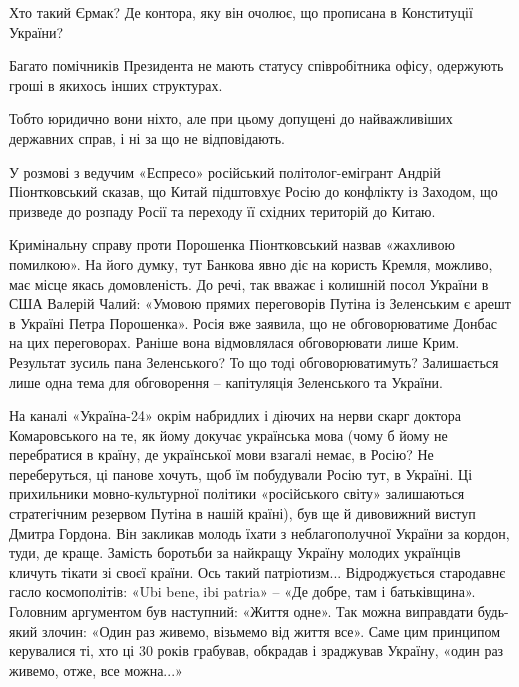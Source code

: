 Хто такий Єрмак? Де контора, яку він очолює, що прописана в Конституції
України?

Багато помічників Президента не мають статусу співробітника офісу, одержують
гроші в якихось інших структурах.

Тобто юридично вони ніхто, але при цьому допущені до найважливіших державних
справ, і ні за що не відповідають.

У розмові з ведучим «Еспресо» російський політолог-емігрант Андрій
Піонтковський сказав, що Китай підштовхує Росію до конфлікту із Заходом, що
призведе до розпаду Росії та переходу її східних територій до Китаю.

Кримінальну справу проти Порошенка Піонтковський назвав «жахливою помилкою». На
його думку, тут Банкова явно діє на користь Кремля, можливо, має місце якась
домовленість. До речі, так вважає і колишній посол України в США Валерій Чалий:
«Умовою прямих переговорів Путіна із Зеленським є арешт в Україні Петра
Порошенка». Росія вже заявила, що не обговорюватиме Донбас на цих переговорах.
Раніше вона відмовлялася обговорювати лише Крим. Результат зусиль пана
Зеленського? То що тоді обговорюватимуть? Залишається лише одна тема для
обговорення – капітуляція Зеленського та України.

На каналі «Україна-24» окрім набридлих і діючих на нерви скарг доктора
Комаровського на те, як йому докучає українська мова (чому б йому не
перебратися в країну, де української мови взагалі немає, в Росію? Не
переберуться, ці панове хочуть, щоб їм побудували Росію тут, в Україні. Ці
прихильники мовно-культурної політики «російського світу» залишаються
стратегічним резервом Путіна в нашій країні), був ще й дивовижний виступ Дмитра
Гордона. Він закликав молодь їхати з неблагополучної України за кордон, туди,
де краще. Замість боротьби за найкращу Україну молодих українців кличуть тікати
зі своєї країни. Ось такий патріотизм... Відроджується стародавнє гасло
космополітів: «Ubi bene, ibi patria» – «Де добре, там і батьківщина». Головним
аргументом був наступний: «Життя одне». Так можна виправдати будь-який злочин:
«Один раз живемо, візьмемо від життя все». Саме цим принципом керувалися ті,
хто ці 30 років грабував, обкрадав і зраджував Україну, «один раз живемо, отже,
все можна...»

